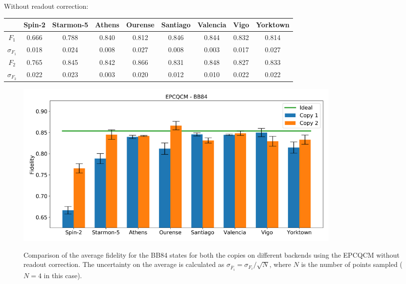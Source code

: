 Without readout correction:
\begin{table}[H]
    \centering
    \begin{tabular}{|c|c|c|c|c|c|c|c|c|}
    \hline
    \textbf{} & \textbf{Spin-2} & \textbf{Starmon-5} & \textbf{Athens} & \textbf{Ourense} & \textbf{Santiago} & \textbf{Valencia} & \textbf{Vigo} & \textbf{Yorktown} \\ \hline
    $F_1$              & 0.666  & 0.788 & 0.840 & 0.812 & 0.846 & 0.844 & 0.832 & 0.814 \\ \hline
    $\sigma_{F_1}$     & 0.018  & 0.024 & 0.008 & 0.027 & 0.008 & 0.003 & 0.017 & 0.027 \\ \hline
    $F_2$              & 0.765  & 0.845 & 0.842 & 0.866 & 0.831 & 0.848 & 0.827 & 0.833 \\ \hline
    $\sigma_{F_2}$     & 0.022  & 0.023 & 0.003 & 0.020 & 0.012 & 0.010 & 0.022 & 0.022 \\ \hline
    \end{tabular}
\end{table}
\begin{figure}[H]
  \centering
          \includegraphics[width=0.8\textwidth]{Figures/Economical/Histograms/histo_bb84.png}
      \label{fig:epc_histo_bb84_not_corrected}
      \caption{Comparison of the average fidelity for the BB84 states for both the copies on different backends using the EPCQCM without readout correction. The uncertainty on the average is calculated as $\sigma_{\overline{F}_i}=\sigma_{F_i}/\sqrt{N}$, where $N$ is the number of points sampled ($N=4$ in this case).}
\end{figure}